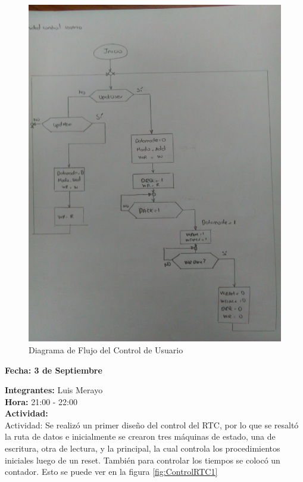 \documentclass[12pt,a4paper]{report}
\begin{document}
\begin{figure}[hbtp]
	\centering
	\includegraphics[width=15cm]{Img/ControlUsuarioFlujo.jpg}
	\caption{Diagrama de Flujo del Control de Usuario}
	\label{fig:FlujoUsuario1}
\end{figure}

\begin{flushright}
	\begin{large}
		\textbf{Fecha: 3 de Septiembre}\\[5ex]
	\end{large}
\end{flushright}

\noindent \textbf{Integrantes:} Luis Merayo \\[1ex]
\textbf{Hora:} 21:00 - 22:00 \\[1ex]
\textbf{Actividad:} \\[2ex]

Actividad: Se realizó un primer diseño del control del RTC, por lo que se resaltó la ruta de datos e inicialmente se crearon tres máquinas de estado, una de escritura, otra de lectura, y la principal, la cual controla los procedimientos iniciales luego de un reset. También para controlar los tiempos se colocó un contador. Esto se puede ver en la figura \ref{fig:ControlRTC1} \\
\end{document}
